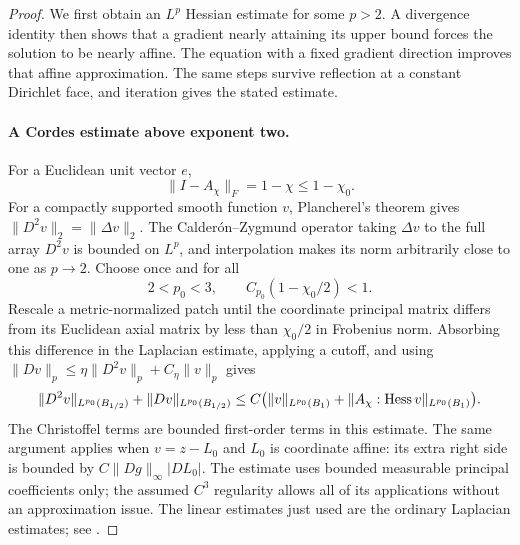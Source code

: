 \begin{proof}
We first obtain an $L^p$ Hessian estimate for some $p>2$.
A divergence identity then shows that a gradient nearly attaining its
upper bound forces the solution to be nearly affine. The equation
with a fixed gradient direction improves that affine approximation.
The same steps survive reflection at a constant Dirichlet face,
and iteration gives the stated estimate.

\paragraph{A Cordes estimate above exponent two.}
For a Euclidean unit vector $e$,
\begin{equation}\label{n3:existence:cordes-defect}
 \|I-A_\chi\|_F=1-\chi\le1-\chi_0.
\end{equation}
For a compactly supported smooth function $v$, Plancherel's theorem
gives $\|D^2v\|_2=\|\Delta v\|_2$.  The Calder\'on--Zygmund
operator taking $\Delta v$ to the full array $D^2v$ is bounded on
$L^p$, and interpolation makes its norm arbitrarily close to one as
$p\to2$.  Choose once and for all
\begin{equation}\label{n3:existence:p-zero}
 2<p_0<3,\qquad
 C_{p_0}(1-\chi_0/2)<1.
\end{equation}
Rescale a metric-normalized patch until the coordinate principal
matrix differs from its Euclidean axial matrix by less than
$\chi_0/2$ in Frobenius norm.  Absorbing this difference in the
Laplacian estimate, applying a cutoff, and using
$\|Dv\|_p\le\eta\|D^2v\|_p+C_\eta\|v\|_p$ gives
\begin{equation}\label{n3:existence:local-cordes}
 \|D^2v\|_{L^{p_0}(B_{1/2})}
 +\|Dv\|_{L^{p_0}(B_{1/2})}
 \le C\bigl(\|v\|_{L^{p_0}(B_1)}
       +\|A_\chi:\operatorname{Hess} v\|_{L^{p_0}(B_1)}\bigr).
\end{equation}
The Christoffel terms are bounded first-order terms in this estimate.
The same argument applies when $v=z-L_0$ and $L_0$ is coordinate
affine: its extra right side is bounded by
$C\|Dg\|_\infty|DL_0|$.
The estimate uses bounded measurable principal coefficients only;
the assumed $C^3$ regularity allows all of its applications
without an approximation issue.  The linear estimates just used are
the ordinary Laplacian estimates; see
\cite[Chapters 7 and 9]{GilbargTrudinger2001}.


\end{proof}
